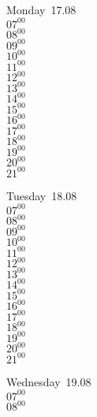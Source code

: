 \documentclass[11pt,a4paper]{book}\usepackage[]{graphicx}\usepackage[]{color}
\begin{document}
{{{{{{\clearpage
\vspace{2 mm}\\
%
%
\begin{tcolorbox}
Monday~17.08\\
{ 
$07^{00}$\\
$08^{00}$\\
$09^{00}$\\
$10^{00}$\\
$11^{00}$\\
$12^{00}$\\
$13^{00}$\\
$14^{00}$\\
$15^{00}$\\
$16^{00}$\\
$17^{00}$\\
$18^{00}$\\
$19^{00}$\\
$20^{00}$\\
$21^{00}$}\\
\end{tcolorbox}
%
\begin{tcolorbox}
Tuesday~18.08\\
{ 
$07^{00}$\\
$08^{00}$\\
$09^{00}$\\
$10^{00}$\\
$11^{00}$\\
$12^{00}$\\
$13^{00}$\\
$14^{00}$\\
$15^{00}$\\
$16^{00}$\\
$17^{00}$\\
$18^{00}$\\
$19^{00}$\\
$20^{00}$\\
$21^{00}$}\\
\end{tcolorbox}
%
\begin{tcolorbox}
Wednesday~19.08\\
{ 
$07^{00}$\\
$08^{00}$\\
}
\end{tcolorbox}}}}}}}
\end{document}
